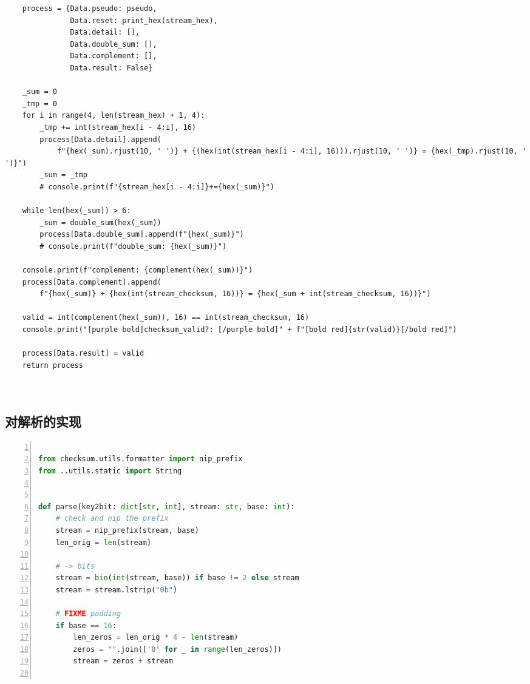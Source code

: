 \documentclass[a4paper,11pt]{article}
\begin{document}
\begin{spacing}{1.2}
\begin{CJK}{UTF8}{gbsn}
\begin{lstlisting}
    process = {Data.pseudo: pseudo,
               Data.reset: print_hex(stream_hex),
               Data.detail: [],
               Data.double_sum: [],
               Data.complement: [],
               Data.result: False}

    _sum = 0
    _tmp = 0
    for i in range(4, len(stream_hex) + 1, 4):
        _tmp += int(stream_hex[i - 4:i], 16)
        process[Data.detail].append(
            f"{hex(_sum).rjust(10, ' ')} + {(hex(int(stream_hex[i - 4:i], 16))).rjust(10, ' ')} = {hex(_tmp).rjust(10, ' ')}")
        _sum = _tmp
        # console.print(f"{stream_hex[i - 4:i]}+={hex(_sum)}")

    while len(hex(_sum)) > 6:
        _sum = double_sum(hex(_sum))
        process[Data.double_sum].append(f"{hex(_sum)}")
        # console.print(f"double_sum: {hex(_sum)}")

    console.print(f"complement: {complement(hex(_sum))}")
    process[Data.complement].append(
        f"{hex(_sum)} + {hex(int(stream_checksum, 16))} = {hex(_sum + int(stream_checksum, 16))}")

    valid = int(complement(hex(_sum)), 16) == int(stream_checksum, 16)
    console.print("[purple bold]checksum_valid?: [/purple bold]" + f"[bold red]{str(valid)}[/bold red]")

    process[Data.result] = valid
    return process

	
\end{lstlisting}


\subsection{对解析的实现}

\begin{lstlisting}[language = Python, numbers=left, numberstyle=\tiny,keywordstyle=\color{blue!70},commentstyle=\color{red!50!green!50!blue!50},frame=shadowbox,rulesepcolor=\color{red!20!green!20!blue!20},basicstyle=\ttfamily]

from checksum.utils.formatter import nip_prefix
from ..utils.static import String


def parse(key2bit: dict[str, int], stream: str, base: int):
    # check and nip the prefix
    stream = nip_prefix(stream, base)
    len_orig = len(stream)

    # -> bits
    stream = bin(int(stream, base)) if base != 2 else stream
    stream = stream.lstrip("0b")

    # FIXME padding
    if base == 16:
        len_zeros = len_orig * 4 - len(stream)
        zeros = "".join(['0' for _ in range(len_zeros)])
        stream = zeros + stream


\end{lstlisting}
\end{CJK}
\end{spacing}
\end{document}
